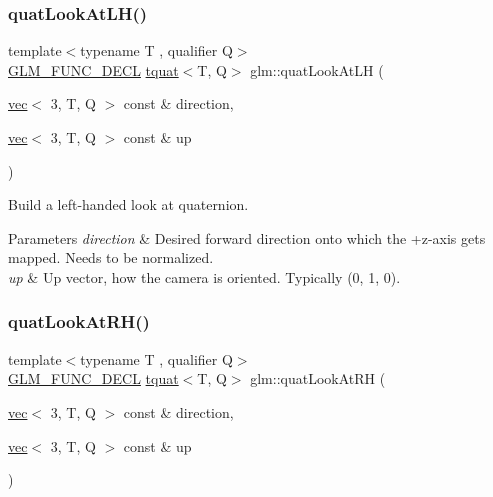 \subsubsection{\texorpdfstring{quat\+Look\+At\+L\+H()}{quatLookAtLH()}}
{\footnotesize\ttfamily template$<$typename T , qualifier Q$>$ \\
\mbox{\hyperlink{setup_8hpp_ab2d052de21a70539923e9bcbf6e83a51}{G\+L\+M\+\_\+\+F\+U\+N\+C\+\_\+\+D\+E\+CL}} \mbox{\hyperlink{structglm_1_1tquat}{tquat}}$<$T, Q$>$ glm\+::quat\+Look\+At\+LH (\begin{DoxyParamCaption}\item[{\mbox{\hyperlink{structglm_1_1vec}{vec}}$<$ 3, T, Q $>$ const \&}]{direction,  }\item[{\mbox{\hyperlink{structglm_1_1vec}{vec}}$<$ 3, T, Q $>$ const \&}]{up }\end{DoxyParamCaption})}

Build a left-\/handed look at quaternion.


\begin{DoxyParams}{Parameters}
{\em direction} & Desired forward direction onto which the +z-\/axis gets mapped. Needs to be normalized. \\
\hline
{\em up} & Up vector, how the camera is oriented. Typically (0, 1, 0). \\
\hline
\end{DoxyParams}
\mbox{\label{group__gtx__quaternion_gad30cbeb78315773b6d18d9d1c1c75b77}} 
\subsubsection{\texorpdfstring{quat\+Look\+At\+R\+H()}{quatLookAtRH()}}
{\footnotesize\ttfamily template$<$typename T , qualifier Q$>$ \\
\mbox{\hyperlink{setup_8hpp_ab2d052de21a70539923e9bcbf6e83a51}{G\+L\+M\+\_\+\+F\+U\+N\+C\+\_\+\+D\+E\+CL}} \mbox{\hyperlink{structglm_1_1tquat}{tquat}}$<$T, Q$>$ glm\+::quat\+Look\+At\+RH (\begin{DoxyParamCaption}\item[{\mbox{\hyperlink{structglm_1_1vec}{vec}}$<$ 3, T, Q $>$ const \&}]{direction,  }\item[{\mbox{\hyperlink{structglm_1_1vec}{vec}}$<$ 3, T, Q $>$ const \&}]{up }\end{DoxyParamCaption})}

